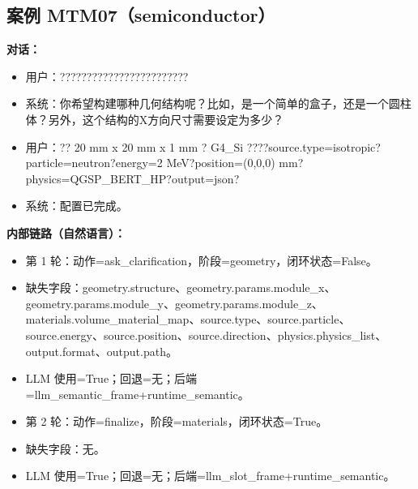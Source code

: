 \documentclass[11pt]{ctexart}
\begin{document}
\subsection{案例 MTM07（semiconductor）}
\textbf{对话：}
\begin{itemize}
\item 用户：????????????????????????
\item 系统：你希望构建哪种几何结构呢？比如，是一个简单的盒子，还是一个圆柱体？另外，这个结构的X方向尺寸需要设定为多少？
\item 用户：?? 20 mm x 20 mm x 1 mm ? G4\_Si ????source.type=isotropic?particle=neutron?energy=2 MeV?position=(0,0,0) mm?physics=QGSP\_BERT\_HP?output=json?
\item 系统：配置已完成。
\end{itemize}
\textbf{内部链路（自然语言）：}
\begin{itemize}
\item 第 1 轮：动作=ask\_clarification，阶段=geometry，闭环状态=False。
\item 缺失字段：geometry.structure、geometry.params.module\_x、geometry.params.module\_y、geometry.params.module\_z、materials.volume\_material\_map、source.type、source.particle、source.energy、source.position、source.direction、physics.physics\_list、output.format、output.path。
\item LLM 使用=True；回退=无；后端=llm\_semantic\_frame+runtime\_semantic。
\item 第 2 轮：动作=finalize，阶段=materials，闭环状态=True。
\item 缺失字段：无。
\item LLM 使用=True；回退=无；后端=llm\_slot\_frame+runtime\_semantic。
\end{itemize}
\end{document}
